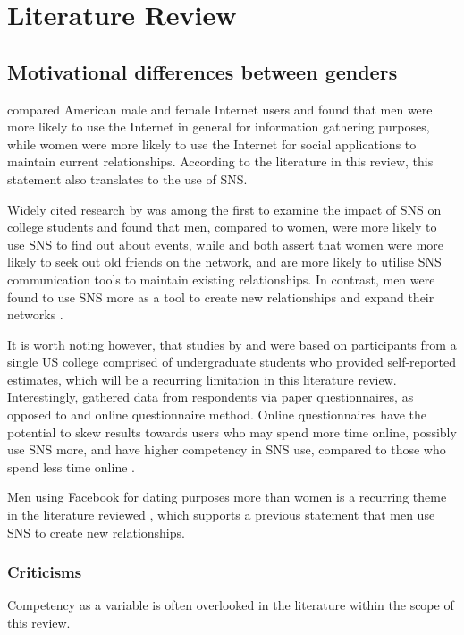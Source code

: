 \section{Literature Review}

\subsection{Motivational differences between genders}

\citet{Fallows2005} compared American male and female Internet users and found that men were more likely to use the Internet in general for information gathering purposes, while women were more likely to use the Internet for social applications to maintain current relationships. According to the literature in this review, this statement also translates to the use of SNS.

Widely cited research by \citet{Raacke2008} was among the first to examine the impact of SNS on college students and found that men, compared to women, were more likely to use SNS to find out about events, while \citet{Mazman2011} and \citet{Muscanell2012} both assert that women were more likely to seek out old friends on the network, and are more likely to utilise SNS communication tools to maintain existing relationships. In contrast, men were found to use SNS more as a tool to create new relationships and expand their networks \citep{Mazman2011}.

It is worth noting however, that studies by \citet{Raacke2008} and \citet{Muscanell2012} were based on participants from a single US college comprised of undergraduate students who provided self-reported estimates, which will be a recurring limitation in this literature review. Interestingly, \citet{Raacke2008} gathered data from respondents via paper questionnaires, as opposed to  and  online questionnaire method. Online questionnaires have the potential to skew results towards users who may spend more time online, possibly use SNS more, and have higher competency in SNS use, compared to those who spend less time online \citep{Hargittai2007}.

Men using Facebook for dating purposes more than women is a recurring theme in the literature reviewed \citep{Muscanell2012, Raacke2008, Haferkamp2012}, which supports a previous statement that men use SNS to create new relationships.



\subsubsection{Criticisms}
Competency as a variable is often overlooked in the literature within the scope of this review.
